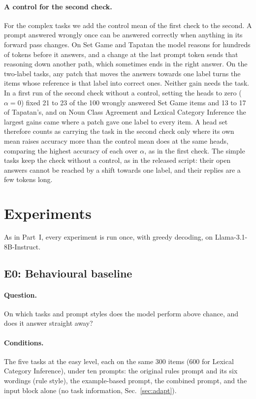 \documentclass[11pt,a4paper]{article}
\begin{document}
\paragraph{A control for the second check.} For the complex tasks we add the control mean of the first check to the second. A prompt answered wrongly once can be answered correctly when anything in its forward pass changes. On Set Game and Tapatan the model reasons for hundreds of tokens before it answers, and a change at the last prompt token sends that reasoning down another path, which sometimes ends in the right answer. On the two-label tasks, any patch that moves the answers towards one label turns the items whose reference is that label into correct ones. Neither gain needs the task. In a first run of the second check without a control, setting the heads to zero ($\alpha=0$) fixed 21 to 23 of the 100 wrongly answered Set Game items and 13 to 17 of Tapatan's, and on Noun Class Agreement and Lexical Category Inference the largest gains came where a patch gave one label to every item. A head set therefore counts as carrying the task in the second check only where its own mean raises accuracy more than the control mean does at the same heads, comparing the highest accuracy of each over $\alpha$, as in the first check. The simple tasks keep the check without a control, as in the released script: their open answers cannot be reached by a shift towards one label, and their replies are a few tokens long.

\section{Experiments}\label{sec:experiments-complex}
As in Part~I, every experiment is run once, with greedy decoding, on Llama-3.1-8B-Instruct.

\subsection{E0: Behavioural baseline}\label{sec:e0-complex}
\paragraph{Question.} On which tasks and prompt styles does the model perform above chance, and does it answer straight away?

\paragraph{Conditions.} The five tasks at the easy level, each on the same 300 items (600 for Lexical Category Inference), under ten prompts: the original rules prompt and its six wordings (rule style), the example-based prompt, the combined prompt, and the input block alone (no task information, Sec.~\ref{sec:adapt}).
\end{document}
